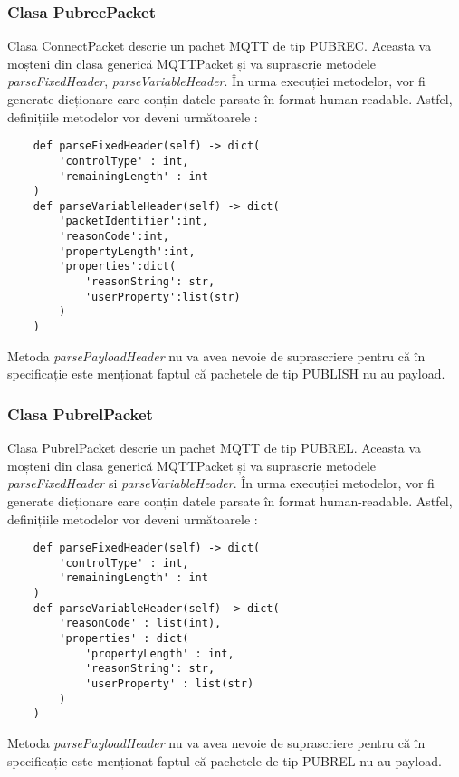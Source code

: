 \documentclass{report}
\begin{document}
\subsubsection{Clasa PubrecPacket}
Clasa ConnectPacket descrie un pachet MQTT de tip PUBREC. Aceasta va moșteni din clasa generică MQTTPacket și va suprascrie metodele \emph{parseFixedHeader}, \emph{parseVariableHeader}.
În urma execuției metodelor, vor fi generate dicționare care conțin datele parsate în format human-readable.
Astfel, definițiile metodelor vor deveni următoarele : 
\\
\begin{verbatim}
	def parseFixedHeader(self) -> dict(
		'controlType' : int, 
		'remainingLength' : int
	)
	def parseVariableHeader(self) -> dict(
		'packetIdentifier':int, 
		'reasonCode':int, 
		'propertyLength':int, 
		'properties':dict(
			'reasonString': str, 
			'userProperty':list(str)
		)
	)
\end{verbatim}
Metoda \emph{parsePayloadHeader} nu va avea nevoie de suprascriere pentru că în specificație este menționat faptul că pachetele de tip PUBLISH nu au payload.
\\
\subsubsection{Clasa PubrelPacket}
Clasa PubrelPacket descrie un pachet MQTT de tip PUBREL. Aceasta va moșteni din clasa generică MQTTPacket și va suprascrie metodele \emph{parseFixedHeader} si \emph{parseVariableHeader}.
În urma execuției metodelor, vor fi generate dicționare care conțin datele parsate în format human-readable.
Astfel, definițiile metodelor vor deveni următoarele : 
\\
\begin{verbatim}
	def parseFixedHeader(self) -> dict(
		'controlType' : int, 
		'remainingLength' : int
	)
	def parseVariableHeader(self) -> dict(
		'reasonCode' : list(int), 
		'properties' : dict(
			'propertyLength' : int, 
			'reasonString': str, 
			'userProperty' : list(str)
		)
	)
\end{verbatim}
Metoda \emph{parsePayloadHeader} nu va avea nevoie de suprascriere pentru că în specificație este menționat faptul că pachetele de tip PUBREL nu au payload.
\end{document}
